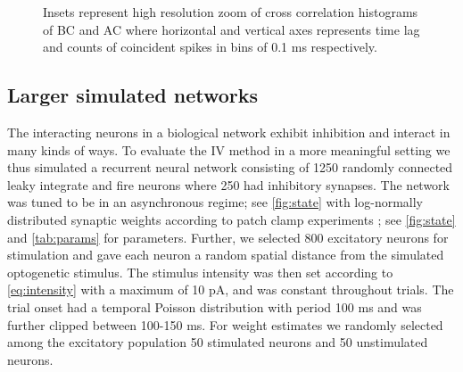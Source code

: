 \documentclass[11pt]{article}
\begin{document}
\begin{figure}
{Insets represent high resolution zoom of cross correlation histograms of BC and AC where horizontal and vertical axes represents time lag and counts of coincident spikes in bins of 0.1 ms respectively. \label{fig:cchvswald}}
\end{figure}

\subsection{Larger simulated networks}
The interacting neurons in a biological network exhibit inhibition and interact in many kinds of ways. To evaluate the IV method in a more meaningful setting we thus simulated a recurrent neural network consisting of 1250 randomly connected leaky integrate and fire neurons where 250 had inhibitory synapses. The network was tuned to be in an asynchronous regime; see \cref{fig:state} with log-normally distributed synaptic weights according to patch clamp experiments \citep{Sayer1990,Mason1991}; see \cref{fig:state} and \cref{tab:params} for parameters. Further, we selected 800 excitatory neurons for stimulation and gave each neuron a random spatial distance from the simulated optogenetic stimulus. The stimulus intensity was then set according to \cref{eq:intensity} with a maximum of 10 pA, and was constant throughout trials. The trial onset had a temporal Poisson distribution with period 100 ms and was further clipped between 100-150 ms. For weight estimates we randomly selected among the excitatory population 50 stimulated neurons and 50 unstimulated neurons. 
\end{document}
